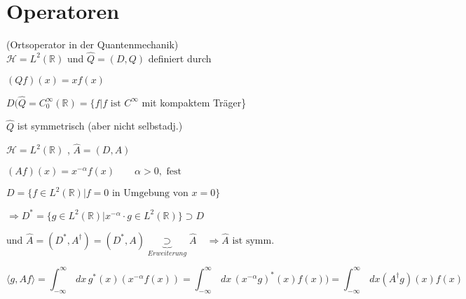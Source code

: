 \section{Operatoren}











\begin{Bsp}{(Ortsoperator in der Quantenmechanik)\\}
    $\mathcal{H} = L^2(\mathbb{R})$ und $\hat{Q} = (D,Q)$ definiert durch

    $(Qf)(x) = x f(x)$

    $D(\hat{Q} = C_0^\infty (\mathbb{R})= \{f | f \textrm{ ist } C^\infty$ mit kompaktem Träger\}

    $\hat{Q}$ ist symmetrisch (aber nicht selbstadj.)
\end{Bsp}

\begin{Bsp}
    $\mathcal{H} = L^2(\mathbb{R})$ , $\hat{A} = (D,A)$

    $(Af)(x) = x^{-\alpha} f(x) \quad \quad \alpha > 0, \textrm{ fest}$

    $D = \{f \in L^2(\mathbb{R}) | f=0 \textrm{ in Umgebung von } x = 0 \}$

    $\Rightarrow D^\ast = \{g \in L^2(\mathbb{R}) | x^{- \alpha} \cdot g \in L^2(\mathbb{R})\} \supset D$

    und $\hat{A} = (D^\ast, A^\dagger) = (D^\ast, A) \underbrace{\supset}_{Erweiterung} \hat{A} \quad \Rightarrow \hat{A} \textrm{ ist symm.}$ 

    $$\langle g , Af \rangle = \int_{-\infty}^\infty \,dx \, g^\ast(x) (x^{- \alpha} f(x)) = 
    \int_{-\infty}^\infty \,dx \, (x^{- \alpha} g)^\ast(x) f(x)) = \int_{-\infty}^\infty \,dx (A^\dagger g)(x) f(x)$$
\end{Bsp}

